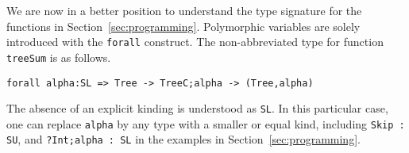 We are now in a better position to understand the type signature for
the functions in Section~\ref{sec:programming}.  Polymorphic variables
are solely introduced with the \lstinline|forall| construct. The
non-abbreviated type for function \lstinline|treeSum| is as follows.
%
\begin{lstlisting}
forall alpha:SL => Tree -> TreeC;alpha -> (Tree,alpha)
\end{lstlisting}
%
The absence of an explicit kinding is understood as \lstinline|SL|. In
this particular case, one can replace \lstinline|alpha| by any type
with a smaller or equal kind, including \lstinline|Skip : SU|, and
\lstinline|?Int;alpha : SL| in the examples in
Section~\ref{sec:programming}.

